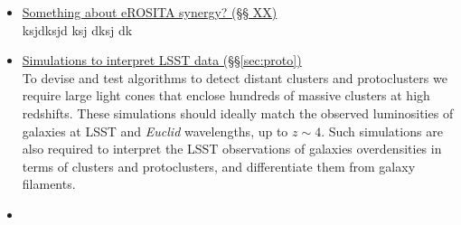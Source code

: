 \documentclass[a4paper,11pt]{article}
\begin{document}
\begin{itemize}
\item\underline{Something about eROSITA synergy? (\S\S
  XX)}\smallskip\\ksjdksjd ksj dksj dk
\item\underline{Simulations to interpret LSST data 
  (\S\S\ref{sec:proto})}\smallskip\\ 
  To devise and test algorithms to detect distant clusters and protoclusters we require large light cones that enclose hundreds of massive clusters at high redshifts. These simulations should ideally match the observed luminosities of galaxies at LSST and \emph{Euclid} wavelengths, up to $z\sim4$.
 Such simulations are also required to interpret the LSST observations of galaxies overdensities in terms of clusters and protoclusters, and differentiate them from galaxy filaments. 
\item
\end{itemize}







\end{document}
